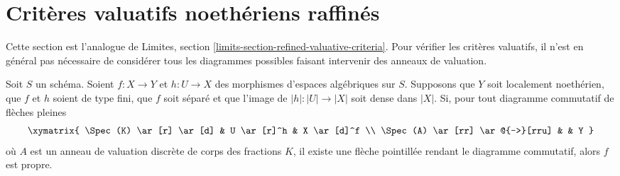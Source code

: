 \section{Critères valuatifs noethériens raffinés}
\label{section-refined-valuative-criteria}

\noindent
Cette section est l'analogue de
Limites, section \ref{limits-section-refined-valuative-criteria}.
Pour v\'erifier les crit\`eres valuatifs, il n'est en g\'en\'eral pas n\'ecessaire
de consid\'erer tous les diagrammes possibles faisant intervenir des anneaux de valuation.

\begin{lemma}
\label{lemma-refined-valuative-criterion-proper}
Soit $S$ un sch\'ema. Soient $f : X \to Y$ et $h : U \to X$ des
morphismes d'espaces alg\'ebriques sur $S$. Supposons que $Y$ soit
localement noeth\'erien, que $f$ et $h$ soient de type fini,
que $f$ soit s\'epar\'e et que l'image de $|h| : |U| \to |X|$
soit dense dans $|X|$. Si, pour tout diagramme commutatif de fl\`eches pleines
$$
\xymatrix{
\Spec(K) \ar[r] \ar[d] & U \ar[r]^h & X \ar[d]^f \\
\Spec(A) \ar[rr] \ar@{-->}[rru] & & Y
}
$$
o\`u $A$ est un anneau de valuation discr\`ete de corps des fractions $K$, il
existe une fl\`eche pointill\'ee rendant le diagramme commutatif, alors $f$ est propre.
\end{lemma}


